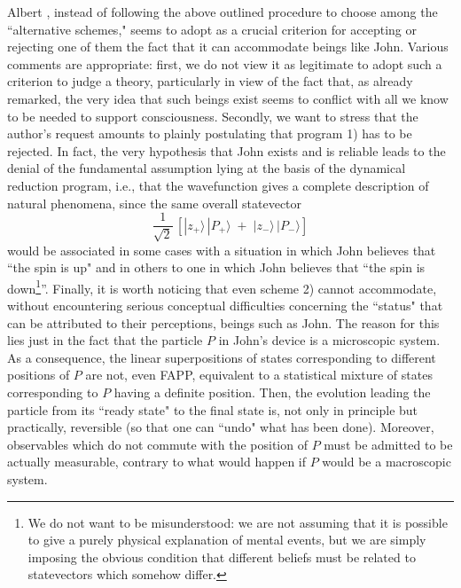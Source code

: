 \documentclass[12pt]{article}
\begin{document}
Albert \cite{ap}, instead of following the above outlined
procedure to choose among the ``alternative schemes," seems to
adopt as a crucial criterion for accepting or rejecting one of
them the fact that it can accommodate beings like John. Various
comments are appropriate: first, we do not view it as legitimate
to adopt such a criterion to judge a theory, particularly in view
of the fact that, as already remarked, the very idea that such
beings exist seems to conflict with all we know to be needed to
support consciousness. Secondly, we want to stress that the
author's request amounts to plainly postulating that program 1)
has to be rejected. In fact, the very hypothesis that John exists
and is reliable leads to the denial of the fundamental assumption
lying at the basis of the dynamical reduction program, i.e., that
the wavefunction gives a complete description of natural
phenomena, since the same overall statevector
\begin{equation}
\frac{1}{\sqrt{2}}\,\left[ |z_{+}\rangle\, |P_{+}\rangle \; + \;
|z_{-}\rangle\, |P_{-}\rangle \right]
\end{equation}
would be associated in some cases with a situation in which John
believes that ``the spin is up" and in others to one in which John
believes that ``the spin is down\footnote{We do not want to be
misunderstood: we are not assuming that it is possible to give a
purely physical explanation of mental events, but we are simply
imposing the obvious condition that different beliefs must be
related to statevectors which somehow differ.}''. Finally, it is
worth noticing that even scheme 2) cannot accommodate, without
encountering serious conceptual difficulties concerning the
``status" that can be attributed to their perceptions, beings such
as John. The reason for this lies just in the fact that the
particle $P$ in John's device is a microscopic system. As a
consequence, the linear superpositions of states corresponding to
different positions of $P$ are not, even FAPP, equivalent to a
statistical mixture of states corresponding to $P$ having a
definite position. Then, the evolution leading the particle from
its ``ready state" to the final state is, not only in principle
but practically, reversible (so that one can ``undo" what has been
done). Moreover, observables which do not commute with the
position of $P$ must be admitted to be actually measurable,
contrary to what would happen if $P$ would be a macroscopic
system.
\end{document}
